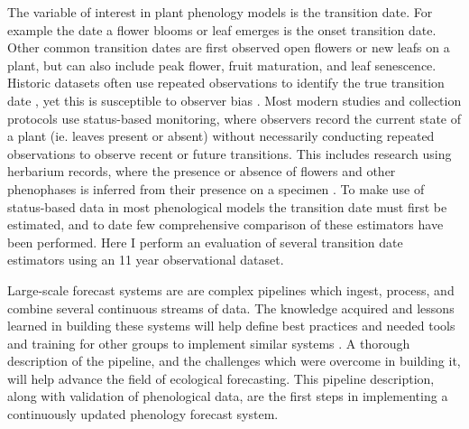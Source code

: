 The variable of interest in plant phenology models is the transition date. For example the date a flower blooms or leaf emerges is the onset transition date. Other common transition dates are first observed open flowers or new leafs on a plant, but can also include peak flower, fruit maturation, and leaf senescence. Historic datasets often use repeated observations to identify the true transition date  \citep{davis2015, wolkovich2012}, yet this is susceptible to observer bias  \citep{miller-rushing2008}. Most modern studies and collection protocols use status-based monitoring, where observers record the current state of a plant (ie. leaves present or absent) without necessarily conducting repeated observations to observe recent or future transitions. This includes research using herbarium records, where the presence or absence of flowers and other phenophases is inferred from their presence on a specimen  \citep{willis2017}. To make use of status-based data in most phenological models the transition date must first be estimated, and to date few comprehensive comparison of these estimators have been performed. Here I perform an evaluation of several transition date estimators using an 11 year observational dataset. 

Large-scale forecast systems are are complex pipelines which ingest, process, and combine several continuous streams of data. The knowledge acquired and lessons learned in building these systems will help define best practices and needed tools and training for other groups to implement similar systems \citep{yenni2019}. A thorough description of the pipeline, and the challenges which were overcome in building it, will help advance the field of ecological forecasting. This pipeline description, along with validation of phenological data, are the first steps in implementing a continuously updated phenology forecast system. 


